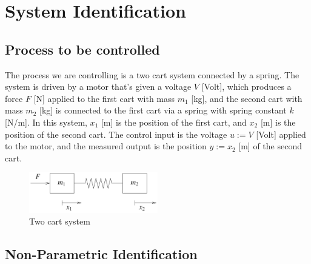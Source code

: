 \documentclass[11pt]{article}
\begin{document}
\label{sec:intro}


\newpage
\section{System Identification}
\label{sec:systemID}


\subsection{Process to be controlled}

The process we are controlling is a two cart system
connected by a spring. The system is driven by a motor that's given a voltage $V$ [Volt], which
produces a force $F$ [N] applied to the first cart with mass $m_1$ [kg], and the second cart
with mass $m_2$ [kg] is connected to the first cart via a spring with spring constant $k$ [N/m].
In this system, $x_1$ [m] is the position of the first cart, and $x_2$ [m] is the position of the second cart.
The control input is the voltage $u := V$ [Volt] applied to the motor, and the measured output
is the position $y := x_2$ [m] of the second cart.
\begin{figure}[!ht]
\centering
\includegraphics[width=0.5\textwidth]{two-cart-system.png}
\caption{Two cart system}
\label{fig:two-cart-system}
\end{figure}

\subsection{Non-Parametric Identification}
\end{document}
